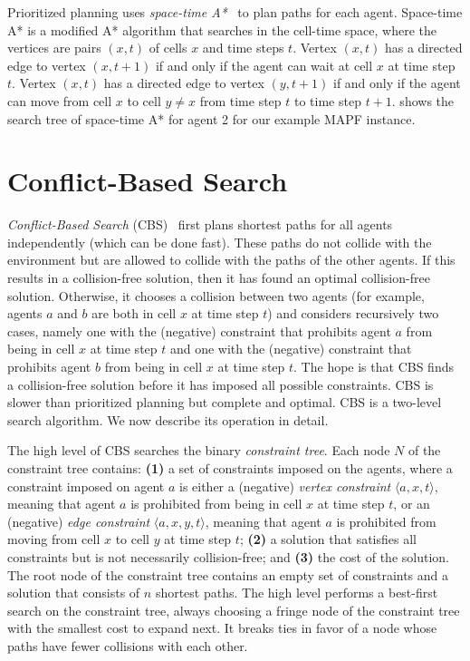 \documentclass[11pt]{article}
\begin{document}
Prioritized planning uses \emph{space-time A*}~\cite{Silver05} to plan paths for each agent. Space-time A* is a modified A* algorithm that searches in the cell-time space, where the vertices are pairs $(x,t)$ of cells $x$ and time steps $t$. Vertex $(x,t)$ has a directed edge to vertex $(x, t+1)$ if and only if the agent can wait at cell $x$ at time step $t$. Vertex $(x,t)$ has a directed edge to vertex $(y, t+1)$ if and only if the agent can move from cell $x$ to cell $y \neq x$ from time step $t$ to time step $t+1$.  shows the search tree of space-time A* for agent 2 for our example MAPF instance.

\section{Conflict-Based Search \label{cbs}}

\emph{Conflict-Based Search} (CBS)~\cite{Feln12,Feln15} first plans shortest paths for all agents independently (which can be done fast). These paths do not collide with the environment but are allowed to collide with the paths of the other agents. If this results in a collision-free solution, then it has found an optimal collision-free solution. Otherwise, it chooses a collision between two agents (for example, agents $a$ and $b$ are both in cell $x$ at time step $t$) and considers recursively two cases, namely one with the (negative) constraint that prohibits agent $a$ from being in cell $x$ at time step $t$ and one with the (negative) constraint that prohibits agent $b$ from being in cell $x$ at time step $t$. The hope is that CBS finds a collision-free solution before it has imposed all possible constraints. CBS is slower than prioritized planning but complete and optimal. CBS is a two-level search algorithm. We now describe its operation in detail.

The high level of CBS searches the binary {\em constraint tree}. Each node $N$ of the constraint tree contains: {\bf (1)} a set of constraints imposed on the agents, where a constraint imposed on agent $a$ is either a (negative) \emph{vertex constraint} $\langle a,x,t \rangle$, meaning that agent $a$ is prohibited from being in cell $x$ at time step $t$, or an (negative) \emph{edge constraint} $\langle a,x,y,t \rangle$, meaning that agent $a$ is prohibited from moving from cell $x$ to cell $y$ at time step $t$; {\bf (2)} a solution that satisfies all constraints but is not necessarily collision-free; and {\bf (3)} the cost of the solution. The root node of the constraint tree contains an empty set of constraints and a solution that consists of $n$ shortest paths. The high level performs a best-first search on the constraint tree, always choosing a fringe node of the constraint tree with the smallest cost to expand next. It breaks ties in favor of a node whose paths have fewer collisions with each other.
\end{document}
